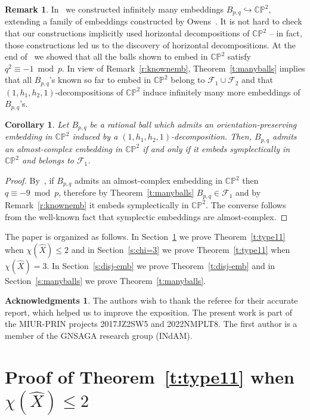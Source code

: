 \documentclass[11pt,a4paper]{amsart}
\newcommand{\CP}{\mathbb{CP}}
\newcommand{\F}{\mathcal F}
\newcommand{\hra}{\hookrightarrow}
\newtheorem{cor}[thm]{Corollary}
\theoremstyle{definition}
\newtheorem{rmk}[thm]{Remark}
\newtheorem*{ack}{Acknowledgments}
\numberwithin{equation}{section}
\begin{document}
\begin{rmk}\label{r: }
In~\cite{LP22-1} we constructed infinitely many embeddings $B_{p,q}\hra\CP^2$, extending a family of embeddings constructed by Owens~\cite{Ow20}. 
It is not hard to check that our constructions implicitly used horizontal decompositions of $\CP^2$ -- in fact, those constructions led us to the discovery of horizontal decompositions. 
At the end of~\cite[Section~3]{LP22-1} we showed that all the balls shown to embed in $\CP^2$ satisfy $q^2\equiv -1\bmod p$. 
In view of Remark~\ref{r:knownemb}, Theorem~\ref{t:manyballs} implies that all $B_{p,q}$'s known so far to embed in $\CP^2$ belong to $\F_1\cup\F_2$ and that $(1,h_1,h_2,1)$-decompositions of $\CP^2$ induce infinitely many more embeddings of $B_{p,q}$'s.  
\end{rmk}

\begin{cor}\label{c:almost-complex}
Let $B_{p,q}$ be a rational ball which admits an orientation-preserving embedding in $\CP^2$ induced by  a $(1,h_1,h_2,1)$-decomposition.
Then, $B_{p,q}$ admits an almost-complex embedding in $\CP^2$ if and only if it embeds symplectically in $\CP^2$ and belongs to $\F_1$.  
\end{cor} 

\begin{proof}
By~\cite[Corollary~1.3]{LP20}, if $B_{p,q}$ admits an almost-complex embedding in $\CP^2$ then $q\equiv -9\bmod p$, therefore by Theorem~\ref{t:manyballs} $B_{p,q}\in\F_1$ and by Remark~\ref{r:knownemb} it embeds symplectically in $\CP^2$. The converse 
follows from the well-known fact that symplectic embeddings are almost-complex.
\end{proof}

The paper is organized as follows. In Section~\ref{s:chileq2} we prove Theorem~\ref{t:type11} when $\chi(\hat X)\leq 2$ and in Section~\ref{s:chi=3} we prove Theorem~\ref{t:type11} when $\chi(\hat X) = 3$. In Section~\ref{s:disj-emb} we prove Theorem~\ref{t:disj-emb} and in Section~\ref{s:manyballs} we prove Theorem~\ref{t:manyballs}.

\begin{ack}
The authors wish to thank the referee for their accurate report, which helped us to improve the exposition. The present work is part of the MIUR-PRIN projects 2017JZ2SW5 and 2022NMPLT8. The first author is a member of the GNSAGA research group (INdAM).
\end{ack}


\section{Proof of Theorem~\ref{t:type11} when $\chi(\hat X)\leq 2$}\label{s:chileq2}
\end{document}
